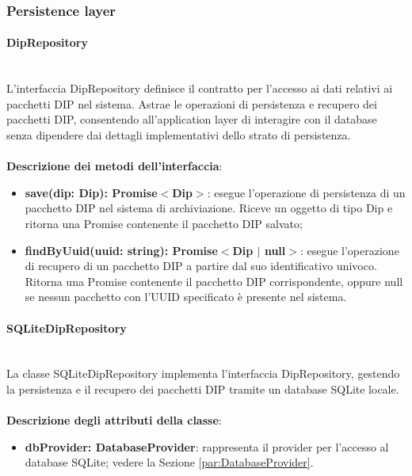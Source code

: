 \documentclass[a4paper,12pt]{article}
\begin{document}
            \subsubsection{Persistence layer} 
                \paragraph{DipRepository}\label{par:DipRepository}\mbox{}\\
                L'interfaccia DipRepository definisce il contratto per l'accesso ai dati relativi ai pacchetti DIP nel sistema. Astrae le operazioni di persistenza e recupero dei pacchetti DIP, consentendo all'application layer di interagire con il database senza dipendere dai dettagli implementativi dello strato di persistenza.\\
                \\
              \noindent \textbf{Descrizione dei metodi dell'interfaccia}:
                \begin{itemize}
                    \item \textbf{save(dip: Dip): Promise$<$Dip$>$}: esegue l'operazione di persistenza di un pacchetto DIP nel sistema di archiviazione. Riceve un oggetto di tipo Dip e ritorna una Promise contenente il pacchetto DIP salvato;
                    \item \textbf{findByUuid(uuid: string): Promise$<$Dip $|$ null$>$}: esegue l'operazione di recupero di un pacchetto DIP a partire dal suo identificativo univoco. Ritorna una Promise contenente il pacchetto DIP corrispondente, oppure null se nessun pacchetto con l'UUID specificato è presente nel sistema.
                \end{itemize}

                \paragraph{SQLiteDipRepository}\label{par:SQLiteDipRepository}\mbox{}\\
                La classe SQLiteDipRepository implementa l'interfaccia DipRepository, gestendo la persistenza e il recupero dei pacchetti DIP tramite un database SQLite locale.\\
                \\
                \textbf{Descrizione degli attributi della classe}:
                \begin{itemize}
                    \item \textbf{dbProvider: DatabaseProvider}: rappresenta il provider per l'accesso al database SQLite; vedere la Sezione \ref{par:DatabaseProvider}.
                \end{itemize}
 
\end{document}
